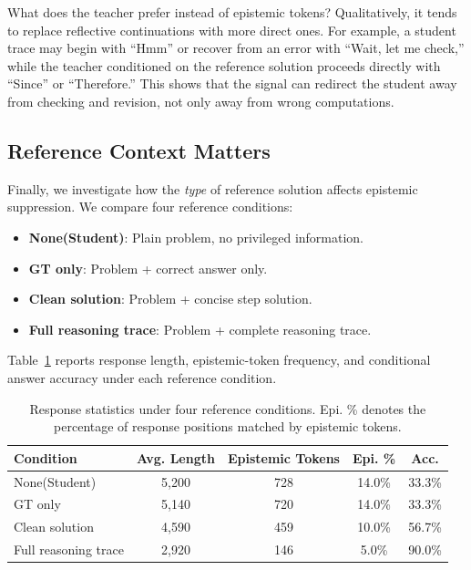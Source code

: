 \documentclass[11pt]{article}
\begin{document}
What does the teacher prefer instead of epistemic tokens?
Qualitatively, it tends to replace reflective continuations with more direct ones.
For example, a student trace may begin with ``Hmm'' or recover from an error with ``Wait, let me check,'' while the teacher conditioned on the reference solution proceeds directly with ``Since'' or ``Therefore.''
This shows that the signal can redirect the student away from checking and revision, not only away from wrong computations.

\subsection{Reference Context Matters}

Finally, we investigate how the \textit{type} of reference solution affects epistemic suppression.
We compare four reference conditions:

\begin{itemize}[leftmargin=*,nosep]
    \item \textbf{None(Student)}: Plain problem, no privileged information.
    \item \textbf{GT only}: Problem + correct answer only.
    \item \textbf{Clean solution}: Problem + concise step solution.
    \item \textbf{Full reasoning trace}: Problem + complete reasoning trace.
\end{itemize}

Table~\ref{tab:ref_context} reports response length, epistemic-token frequency, and conditional answer accuracy under each reference condition.

\begin{table}[t!]
\centering
\small
\begin{tabular}{lcccc}
\toprule
\textbf{Condition} & \textbf{Avg. Length} & \textbf{Epistemic Tokens} & \textbf{Epi. \%} & \textbf{Acc.} \\
\midrule
None(Student) & 5,200 & 728 & 14.0\% & 33.3\% \\
GT only & 5,140 & 720 & 14.0\% & 33.3\% \\
Clean solution & 4,590 & 459 & 10.0\% & 56.7\% \\
Full reasoning trace & 2,920 & 146 & 5.0\% & 90.0\% \\
\bottomrule
\end{tabular}
\caption{Response statistics under four reference conditions. Epi. \% denotes the percentage of response positions matched by epistemic tokens.}
\label{tab:ref_context}
\end{table}
\end{document}
